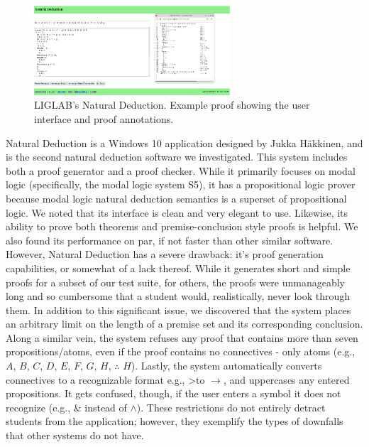 \documentclass[ms]{uncgdissertationexp2}
\theoremstyle{plain}
\theoremstyle{definition}
\theoremstyle{remark}
\newcommand{\titlecaption}[2]{\caption[#1]{#1. #2}}
\begin{document}
    \begin{figure}[h]
        \centering
        \includegraphics[width=0.65\textwidth]{teachinglogic.png}
        \titlecaption{LIGLAB's Natural Deduction}{Example proof showing the user interface and proof annotations.}
        \label{fig:liglab}
    \end{figure} 

    Natural Deduction is a Windows 10 application designed by Jukka H\"akkinen, and is the second natural deduction software we investigated. This system includes both a proof generator and a proof checker. While it primarily focuses on modal logic (specifically, the modal logic system S5), it has a propositional logic prover because modal logic natural deduction semantics is a superset of propositional logic. We noted that its interface is clean and very elegant to use. Likewise, its ability to prove both theorems and premise-conclusion style proofs is helpful. We also found its performance on par, if not faster than other similar software. However, Natural Deduction has a severe drawback: it's proof generation capabilities, or somewhat of a lack thereof. While it generates short and simple proofs for a subset of our test suite, for others, the proofs were unmanageably long and so cumbersome that a student would, realistically, never look through them. In addition to this significant issue, we discovered that the system places an arbitrary limit on the length of a premise set and its corresponding conclusion. Along a similar vein, the system refuses any proof that contains more than seven propositions/atoms, even if the proof contains no connectives - only atoms (e.g., $A$, $B$, $C$, $D$, $E$, $F$, $G$, $H$, $\therefore$ $H$). Lastly, the system automatically converts connectives to a recognizable format e.g., \textgreater\;to $\to$, and uppercases any entered propositions. It gets confused, though, if the user enters a symbol it does not recognize (e.g., \& instead of $\land$). These restrictions do not entirely detract students from the application; however, they exemplify the types of downfalls that other systems do not have.
\end{document}
